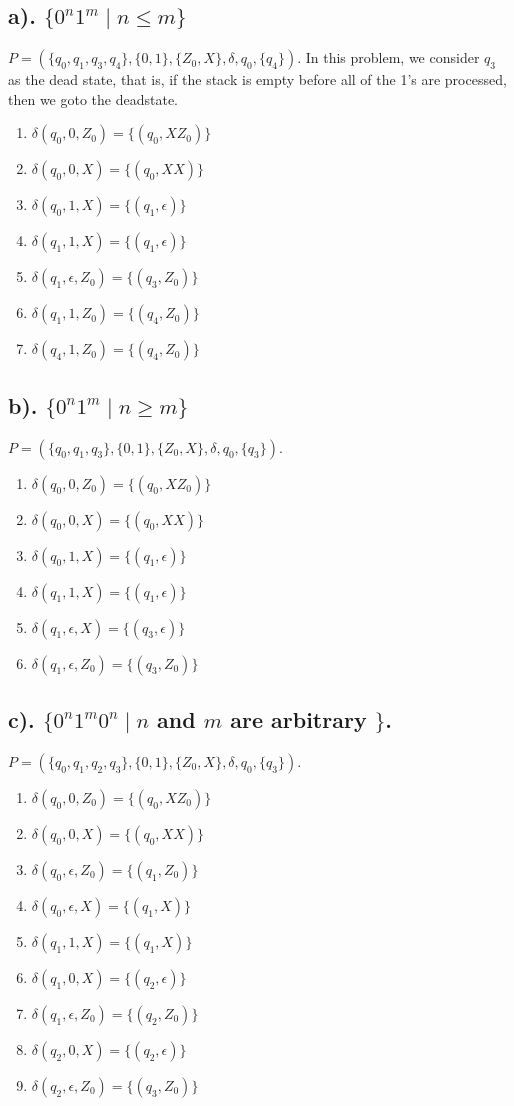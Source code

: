 \documentclass[20pt]{article} %
\begin{document}
\subsection{a). $\{0^{n}1^{m} \mid n \leq m\}$}
$P = (\{q_0, q_1, q_3, q_4\}, \{0,1\}, \{Z_0, X\}, \delta, q_0, \{q_4\})$.
In this problem, we consider $q_3$ as the dead state, that is, if the stack is empty before all of the 1's are processed, then we goto the deadstate.
\begin{enumerate}
\item $\delta(q_0, 0, Z_0) = \{(q_0, XZ_0)\}$
\item $\delta(q_0, 0, X) = \{(q_0, XX)\}$
\item $\delta(q_0, 1, X) = \{(q_1, \epsilon)\}$
\item $\delta(q_1, 1, X) = \{(q_1, \epsilon)\}$
\item $\delta(q_1, \epsilon, Z_0) = \{(q_3, Z_0)\}$
\item $\delta(q_1, 1, Z_0) = \{(q_4, Z_0)\}$
\item $\delta(q_4, 1, Z_0) = \{(q_4, Z_0)\}$
\end{enumerate}
\subsection{b). $\{0^{n}1^{m} \mid n \geq m\}$}
$P = (\{q_0, q_1, q_3\}, \{0,1\}, \{Z_0, X\}, \delta, q_0, \{q_3\})$.
\begin{enumerate}
\item $\delta(q_0, 0, Z_0) = \{(q_0, XZ_0)\}$
\item $\delta(q_0, 0, X) = \{(q_0, XX)\}$
\item $\delta(q_0, 1, X) = \{(q_1, \epsilon)\}$
\item $\delta(q_1, 1, X) = \{(q_1, \epsilon)\}$
\item $\delta(q_1, \epsilon, X) = \{(q_3, \epsilon)\}$
\item $\delta(q_1, \epsilon, Z_0) = \{(q_3, Z_0)\}$
\end{enumerate}
\subsection{c). $\{0^{n}1^{m}0^{n} \mid n$ and $m$ are arbitrary $\}$.}
$P = (\{q_0, q_1, q_2, q_3\}, \{0,1\}, \{Z_0, X\}, \delta, q_0, \{q_3\})$.
\begin{enumerate}
\item $\delta(q_0, 0, Z_0) = \{(q_0, XZ_0)\}$
\item $\delta(q_0, 0, X) = \{(q_0, XX)\}$
\item $\delta(q_0, \epsilon, Z_0) = \{(q_1, Z_0)\}$
\item $\delta(q_0, \epsilon, X) = \{(q_1, X)\}$
\item $\delta(q_1, 1, X) = \{(q_1, X)\}$
\item $\delta(q_1, 0, X) = \{(q_2, \epsilon)\}$
\item $\delta(q_1, \epsilon, Z_0) = \{(q_2, Z_0)\}$
\item $\delta(q_2, 0, X) = \{(q_2, \epsilon)\}$
\item $\delta(q_2, \epsilon, Z_0) = \{(q_3, Z_0)\}$
\end{enumerate}
\end{document}
